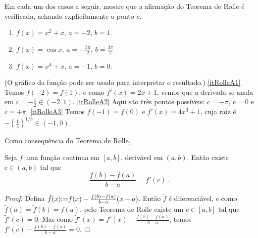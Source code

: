 \begin{exo}
Em cada um dos casos a seguir, mostre que a afirmação do Teorema de Rolle é
verificada, achando explicitamente o ponto $c$.
\begin{multicols}{2}
\begin{enumerate}
\item\label{itRolleA1} $f(x)=x^2+x$, $a=-2$, $b=1$.
\item\label{itRolleA2} $f(x)=\cos x$, $a=-\frac{3\pi}{2}$, $b=\frac{3\pi}{2}$
\item\label{itRolleA3} $f(x)=x^4+x$, $a=-1$, $b=0$.
\end{enumerate}
\end{multicols}
\vspace{0.01cm}
\begin{sol}
(O gráfico da função pode ser usado para interpretar o resultado.)
\eqref{itRolleA1} Temos $f(-2)=f(1)$, e como $f'(x)=2x+1$, vemos que a derivada
se anula em $c=-\frac{1}{2}\in (-2,1)$.
\eqref{itRolleA2} Aqui são três pontos possíveis: $c=-\pi$, $c=0$ e $c=+\pi$.
\eqref{itRolleA3} Temos $f(-1)=f(0)$ e $f'(x)=4x^3+1$, cuja raiz é 
$-(\frac14)^{1/3}\in (-1,0)$.
\end{sol}
\end{exo}

Como consequência do Teorema de Rolle,
\begin{cor}\label{Corol:ValorIntermDeriv}
  Seja $f$ uma função contínua em $[a,b]$, derivável em $(a,b)$. Então
existe $c\in (a,b)$ tal que
$$\frac{f(b)-f(a)}{b-a}=f'(c)\,.$$
\end{cor}
\begin{proof}
 Defina $\tilde{f}(x){:=} f(x)-\frac{f(b)-f(a)}{b-a}(x-a)$. 
Então $\tilde{f}$ é diferenciável, e 
como $\tilde{f}(a)=\tilde{f}(b)=f(a)$, pelo Teorema de Rolle existe um
$c\in [a,b]$ tal que $\tilde{f}'(c)=0$.
Mas como $\tilde{f}'(x)=f'(x)-\frac{f(b)-f(a)}{b-a}$, temos 
$f'(c)-\frac{f(b)-f(a)}{b-a}=0$.
\end{proof}

